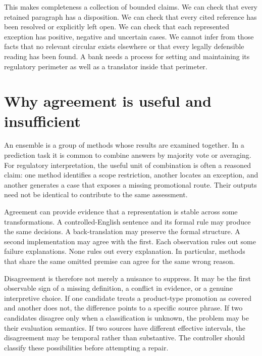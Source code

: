 \documentclass[12pt,a4paper,oneside,openany]{book}
\begin{document}
This makes completeness a collection of bounded claims. We can check that every
retained paragraph has a disposition. We can check that every cited reference has
been resolved or explicitly left open. We can check that each represented
exception has positive, negative and uncertain cases. We cannot infer from those
facts that no relevant circular exists elsewhere or that every legally
defensible reading has been found. A bank needs a process for setting and
maintaining its regulatory perimeter as well as a translator inside that perimeter.

\section{Why agreement is useful and insufficient}
\label{merge:M01:04}

\label{sec:problem-agreement}
An ensemble is a group of methods whose results are examined together. In a
prediction task it is common to combine answers by majority vote or averaging.
For regulatory interpretation, the useful unit of combination is often a
reasoned claim: one method identifies a scope restriction, another locates an
exception, and another generates a case that exposes a missing promotional route.
Their outputs need not be identical to contribute to the same assessment.

Agreement can provide evidence that a representation is stable across some
transformations. A controlled-English sentence and its formal rule may produce
the same decisions. A back-translation may preserve the formal structure. A
second implementation may agree with the first. Each observation rules out some
failure explanations. None rules out every explanation. In particular, methods
that share the same omitted premise can agree for the same wrong reason.

Disagreement is therefore not merely a nuisance to suppress. It may be the first
observable sign of a missing definition, a conflict in evidence, or a genuine
interpretive choice. If one candidate treats a product-type promotion as covered
and another does not, the difference points to a specific source phrase. If two
candidates disagree only when a classification is unknown, the problem may be
their evaluation semantics. If two sources have different effective intervals,
the disagreement may be temporal rather than substantive. The controller should
classify these possibilities before attempting a repair.
\end{document}
